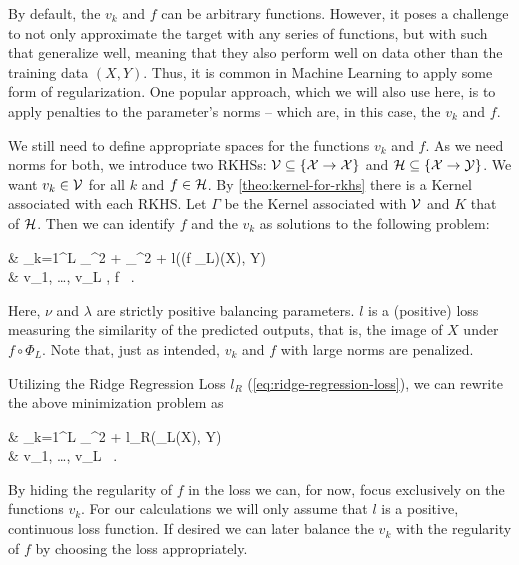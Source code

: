 By default, the $v_k$ and $f$ can be arbitrary functions.
However, it poses a challenge to not only approximate the target with any series of functions, but with such that generalize well, meaning that they also perform well on data other than the training data $(X, Y)$.
Thus, it is common in Machine Learning \cite{goodfellow16} to apply some form of regularization.
One popular approach, which we will also use here, is to apply penalties to the parameter's norms -- which are, in this case, the $v_k$ and $f$.

We still need to define appropriate spaces for the functions $v_k$ and $f$.
As we need norms for both, we introduce two RKHSs:
$\mathcal{V} \subseteq \{\mathcal{X} \rightarrow \mathcal{X}\}$ and $\mathcal{H} \subseteq \{\mathcal{X} \rightarrow \mathcal{Y}\}$.
We want $v_k \in \mathcal{V}$ for all $k$ and $f \in \mathcal{H}$.
By \cref{theo:kernel-for-rkhs} there is a Kernel associated with each RKHS.
Let $\Gamma$ be the Kernel associated with $\mathcal{V}$ and $K$ that of $\mathcal{H}$.
Then we can identify $f$ and the $v_k$ as solutions to the following problem:
\begin{problem}
	\label{prob:min-v-f}
	\begin{cases}
		 & \nu \cdot {} \sum_{k=1}^{L} _\cV^2
		+ \lambda {}_\cH^2 
		+ l((f \circ \Phi_L)(X), Y) \\
		 & v_1, \ldots, v_L \in \cV, f \in \cH \ .
	\end{cases}
\end{problem}
Here, $\nu$ and $\lambda$ are strictly positive balancing parameters.
$l$ is a (positive) loss measuring the similarity of the predicted outputs, that is, the image of $X$ under $f \circ \Phi_L$.
Note that, just as intended, $v_k$ and $f$ with large norms are penalized.

Utilizing the Ridge Regression Loss $l_R$ (\cref{eq:ridge-regression-loss}), we can rewrite the above minimization problem as
\begin{problem}
	\begin{cases}
		 & \nu \cdot {} \sum_{k=1}^{L} _\cV^2
		+ l_R(\Phi_L(X), Y) \\
		 & v_1, \ldots, v_L \in \cV\ .
	\end{cases}
\end{problem}
By hiding the regularity of $f$ in the loss we can, for now, focus exclusively on the functions $v_k$.
For our calculations we will only assume that $l$ is a positive, continuous loss function.
If desired we can later balance the $v_k$ with the regularity of $f$ by choosing the loss appropriately.

